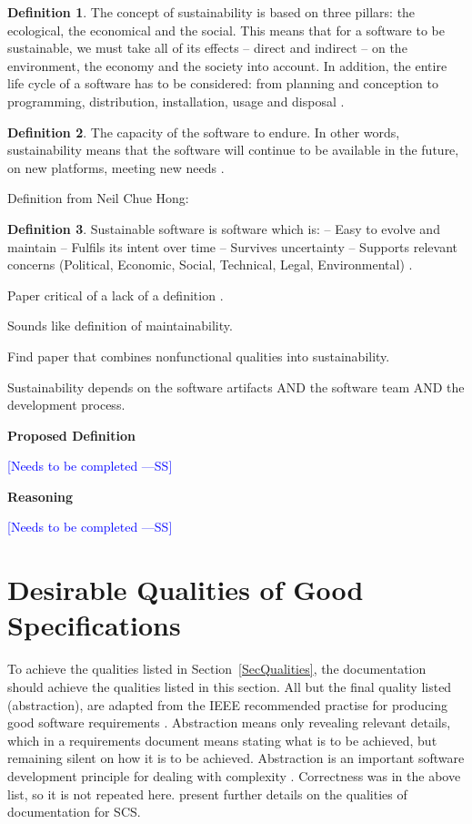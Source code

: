 \documentclass[letterpaper,cleveref]{lipics-v2019}
\newcommand{\authornote}[3]{\textcolor{#1}{[#3 ---#2]}}
\newcommand{\authornote}[3]{}
\newcommand{\wss}[1]{\authornote{blue}{SS}{#1}} %
\theoremstyle{definition}
\newtheorem{defn}{Definition}
\begin{document}
\begin{defn}
  The concept of sustainability is based on three pillars: the
  ecological, the economical and the social. This means that for a software to
  be sustainable, we must take all of its effects -- direct and indirect -- on
  the environment, the economy and the society into account. In addition, the
  entire life cycle of a software has to be considered: from planning and
  conception to programming, distribution, installation, usage and
  disposal \citep{Heine2017}.
\end{defn}

\begin{defn}
  \noindent The capacity of the software to endure. In other words,
  sustainability means that the software will continue to be available in the
  future, on new platforms, meeting new needs \citep{Katz2016}.
\end{defn}

Definition from Neil Chue Hong:
\begin{defn}
Sustainable software is software which is:
-- Easy to evolve and maintain
-- Fulfils its intent over time
-- Survives uncertainty
-- Supports relevant concerns (Political, Economic, Social, Technical,
Legal, Environmental) \citep{Katz2016}.
\end{defn}

Paper critical of a lack of a definition \citep{VentersEtAl2014}.

Sounds like definition of maintainability.

Find paper that combines nonfunctional qualities into sustainability.

Sustainability depends on the software artifacts AND the software team AND the
development process.

\noindent \textbf{Proposed Definition} 

\wss{Needs to be completed}

\noindent \textbf{Reasoning}

\wss{Needs to be completed}

\section{Desirable Qualities of Good Specifications} \label{SecDesirableQs}

To achieve the qualities listed in Section~\ref{SecQualities}, the documentation
should achieve the qualities listed in this section.  All but the final quality
listed (abstraction), are adapted from the IEEE recommended practise for
producing good software requirements \citep{IEEE1998}.  Abstraction means only
revealing relevant details, which in a requirements document means stating what
is to be achieved, but remaining silent on how it is to be achieved.
Abstraction is an important software development principle for dealing with
complexity \citep[p.~40]{GhezziEtAl2003}.  Correctness was in the above list, so
it is not repeated here.  \citet{SmithAndKoothoor2016} present further details
on the qualities of documentation for SCS.
\end{document}
